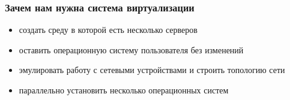 \begin{frame}
\frametitle{Зачем нам нужна система виртуализации}
\begin{itemize}
\item создать среду в которой есть несколько серверов
\item оставить операционную систему пользователя без изменений
\item эмулировать работу с сетевыми устройствами и строить топологию сети
\item параллельно установить несколько операционных систем
\end{itemize}
\end{frame}